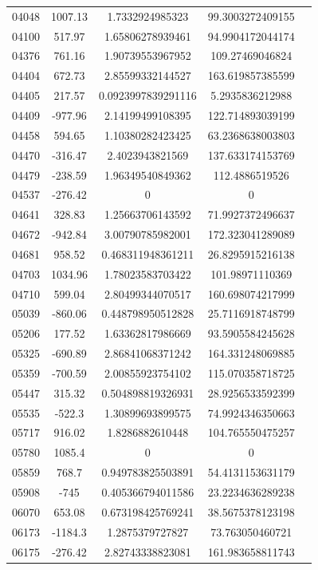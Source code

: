 {\begin{longtable}{ccccc}
04048 & 1007.13 & 1.7332924985323 & 99.3003272409155 \\
04100 & 517.97 & 1.65806278939461 & 94.9904172044174 \\
04376 & 761.16 & 1.90739553967952 & 109.27469046824 \\
04404 & 672.73 & 2.85599332144527 & 163.619857385599 \\
04405 & 217.57 & 0.0923997839291116 & 5.2935836212988 \\
04409 & -977.96 & 2.14199499108395 & 122.714893039199 \\
04458 & 594.65 & 1.10380282423425 & 63.2368638003803 \\
04470 & -316.47 & 2.4023943821569 & 137.633174153769 \\
04479 & -238.59 & 1.96349540849362 & 112.4886519526 \\
04537 & -276.42 & 0 & 0 \\
04641 & 328.83 & 1.25663706143592 & 71.9927372496637 \\
04672 & -942.84 & 3.00790785982001 & 172.323041289089 \\
04681 & 958.52 & 0.468311948361211 & 26.8295915216138 \\
04703 & 1034.96 & 1.78023583703422 & 101.98971110369 \\
04710 & 599.04 & 2.80499344070517 & 160.698074217999 \\
05039 & -860.06 & 0.448798950512828 & 25.7116918748799 \\
05206 & 177.52 & 1.63362817986669 & 93.5905584245628 \\
05325 & -690.89 & 2.86841068371242 & 164.331248069885 \\
05359 & -700.59 & 2.00855923754102 & 115.070358718725 \\
05447 & 315.32 & 0.504898819326931 & 28.9256533592399 \\
05535 & -522.3 & 1.30899693899575 & 74.9924346350663 \\
05717 & 916.02 & 1.8286882610448 & 104.765550475257 \\
05780 & 1085.4 & 0 & 0 \\
05859 & 768.7 & 0.949783825503891 & 54.4131153631179 \\
05908 & -745 & 0.405366794011586 & 23.2234636289238 \\
06070 & 653.08 & 0.673198425769241 & 38.5675378123198 \\
06173 & -1184.3 & 1.2875379727827 & 73.763050460721 \\
06175 & -276.42 & 2.82743338823081 & 161.983658811743 \\

\end{longtable}}
